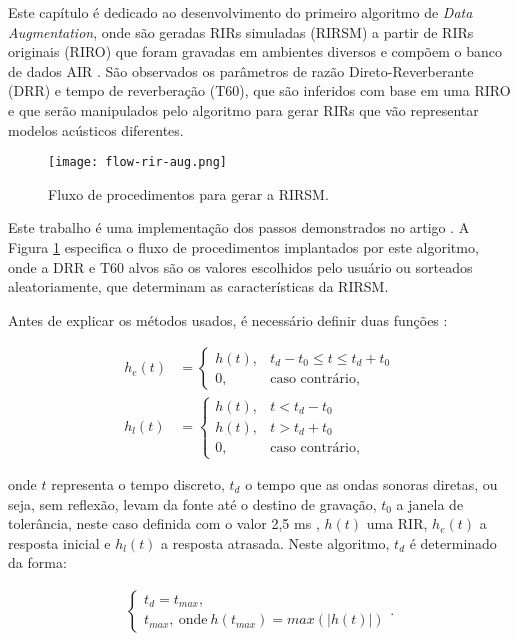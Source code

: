 Este capítulo é dedicado ao desenvolvimento do primeiro algoritmo de \textit{Data Augmentation}, onde são geradas RIRs simuladas (RIRSM)
a partir de RIRs originais (RIRO) que foram gravadas em ambientes diversos e compõem o banco de dados AIR \cite{AIR_Database}. 
São observados os parâmetros de razão Direto-Reverberante (DRR) e tempo de reverberação (T60), que são
inferidos com base em uma RIRO e que serão manipulados pelo algoritmo para gerar RIRs que vão representar modelos acústicos diferentes.

\begin{figure} [H]
    \centering
    \texttt{[image: flow-rir-aug.png]}
    \caption{Fluxo de procedimentos para gerar a RIRSM.}
    \label{fig:flow-rir-aug}
\end{figure}

Este trabalho é uma implementação dos passos demonstrados no artigo \cite{RIR_Data_Aug}. A Figura \ref{fig:flow-rir-aug} especifica 
o fluxo de procedimentos implantados por este algoritmo, onde a DRR e T60 alvos são os valores escolhidos pelo usuário ou sorteados aleatoriamente,
que determinam as características da RIRSM. 

Antes de explicar os métodos usados, é necessário definir duas funções \cite{RIR_Data_Aug}:

\begin{align} 
    h_e(t) &= 
    \begin{cases} \label{eqn:rir-early}
        h(t), & t_d-t_0 \le t \le t_d+t_0 \\
        0, & \text{caso contrário,}
    \end{cases} \\
    h_l(t) &= 
    \begin{cases} \label{eqn:rir-late}
        h(t), & t < t_d - t_0 \\
        h(t), & t > t_d + t_0 \\
        0, & \text{caso contrário,}
    \end{cases}
\end{align}

\noindent
onde $t$ representa o tempo discreto, $t_d$ o tempo que as ondas sonoras diretas, ou seja, sem reflexão, levam da fonte até o destino de gravação,
$t_0$ a janela de tolerância, neste caso definida com o valor 2,5 ms \cite{RIR_Data_Aug}, 
$h(t)$ uma RIR, $h_e(t)$ a resposta inicial e $h_l(t)$ a resposta atrasada.
Neste algoritmo, $t_d$ é determinado da forma:

\begin{align} \label{eqn:t_d}
    \begin{cases}
        t_d = t_{max},\\
        t_{max}, \ \text{onde} \ h(t_{max}) = max(|h(t)|)
    \end{cases}
    .
\end{align}


